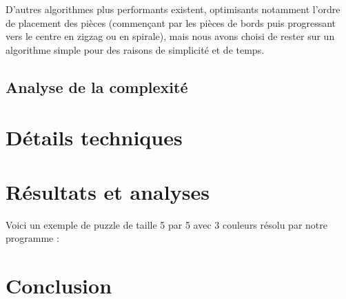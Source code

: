 \documentclass[12pt, openany]{report}
\begin{document}
D'autres algorithmes plus performants existent, optimisants notamment
l'ordre de placement des pièces (commençant par les pièces de bords
puis progressant vers le centre en zigzag ou en spirale), mais nous
avons choisi de rester sur un algorithme simple pour des raisons de
simplicité et de temps.

\subsection*{Analyse de la complexité}


\section*{Détails techniques}


\section*{Résultats et analyses}

Voici un exemple de puzzle de taille 5 par 5 avec 3 couleurs résolu
par notre programme :

\begin{verbnobox}\fontsize{7pt}{7pt}\selectfont
\end{verbnobox}








\section*{Conclusion}
\end{document}
